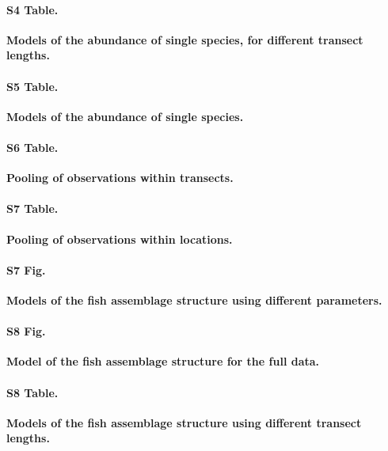 \documentclass[10pt,letterpaper]{article}
\begin{document}
\paragraph*{S4 Table.}
\label{glmmTMB_ind_species_CAP_table}
{\bf Models of the abundance of single species, for different transect lengths.}

\paragraph*{S5 Table.}
\label{glmm_all_species_table_island_fixed}
{\bf Models of the abundance of single species.}


\paragraph*{S6 Table.}
\label{tab:pooling_observations_location}
{\bf Pooling of observations within transects.}

\paragraph*{S7 Table.}
\label{tab:pooling_observations_transect}
{\bf Pooling of observations within locations.}


\paragraph*{S7 Fig.}
\label{fig:PERMANOVA_residuals_parameters_boxplots}
{\bf Models of the fish assemblage structure using different parameters.}

\paragraph*{S8 Fig.}
\label{fig:PERMANOVA_squaredR_parameters_boxplots}
{\bf Model of the fish assemblage structure for the full data.}

\paragraph*{S8 Table.}
\label{PERMANOVAmodel}
{\bf Models of the fish assemblage structure using different transect lengths.}
\end{document}
